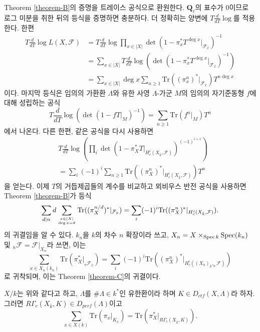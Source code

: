 \noindent
Theorem \ref{theorem-B}의 증명을 트레이스 공식으로 환원한다.
$\mathbf{Q}_\ell$의 표수가 0이므로 로그 미분을 취한 뒤의 등식을
증명하면 충분하다. 더 정확히는 양변에
$T\frac{d}{dT} \log$를 적용한다. 한편
\begin{align*}
T \frac{d}{dT} \log L(X, \mathcal{F})
& =
T\frac{d}{dT} \log
\prod_{x \in |X|} \det(1 - \pi_x^* T^{\deg x} |_{\mathcal{F}_{\bar x}})^{-1} \\
& =
\sum_{x \in |X|} T \frac{d}{dT} \log
( \det(1 - \pi_x^* T^{\deg x} |_{\mathcal{F}_{\bar x}})^{-1}) \\
& =
\sum_{x \in |X|} \deg x
\sum_{n \geq 1} \text{Tr}((\pi_x^n)^* |_{\mathcal{F}_{\bar x}}) T^{n\deg x}
\end{align*}
이다. 마지막 등식은 임의의 가환환 $\Lambda$와 유한 사영
$\Lambda$-가군 $M$의 임의의 자기준동형 $f$에 대해 성립하는 공식
$$
T\frac{d}{dT}\log\left(\det\left(1-fT|_M\right)^{-1}\right) = \sum_{n\geq 1}
\text{Tr}(f^n|_M)T^n
$$
에서 나온다. 다른 한편, 같은 공식을 다시 사용하면
\begin{align*}
& T\frac{d}{dT} \log\left(
\prod\nolimits_i
\det(1-\pi_X^*T |_{H_c^i\left(X_{\bar k} , \mathcal{F}\right)})^{(-1)^{i+1}}
\right) \\
& =
\sum\nolimits_i (-1)^i \sum\nolimits_{n \geq 1}
\text{Tr}\left((\pi_X^n)^* |_{H_c^i(X_{\bar k},\mathcal{F})}\right) T^n
\end{align*}
을 얻는다. 이제 $T$의 거듭제곱들의 계수를 비교하고 뫼비우스
반전 공식을 사용하면 Theorem \ref{theorem-B}가 등식
$$
\sum_{d | n} d \sum_{x \in |X| \atop \deg x = d}
\text{Tr}((\pi_X^{n/d})^* |_{\mathcal{F}_{\bar x}}) =
\sum_i (-1)^i \text{Tr}((\pi^n_X)^* |_{H^i_c(X_{\bar k}, \mathcal{F})}).
$$
의 귀결임을 알 수 있다. $k_n$을 $k$의 차수 $n$ 확장이라 쓰고,
$X_n = X \times_{\mathop{\mathrm{Spec}} k} \mathop{\mathrm{Spec}}(k_n)$ 및
$_n\mathcal{F} = \mathcal{F}|_{X_n}$라 쓰면, 이는
$$
\sum_{x \in X_n(k_n)} \text{Tr}(\pi_X^* |_{_n\mathcal{F}_{\bar x}})
=
\sum_i (-1)^i \text{Tr}((\pi^n_X)^* |_{H^i_c({(X_n)}_{\bar k}, _n\mathcal{F})})
$$
로 귀착되며, 이는 Theorem \ref{theorem-C}의 귀결이다.



\begin{theorem}
\label{theorem-D}
$X/k$는 위와 같다고 하고, $\Lambda$를
$\#\Lambda \in k^*$인 유한환이라 하며
$K\in D_{ctf}(X, \Lambda)$라 하자. 그러면
$R\Gamma_c(X_{\bar k}, K)\in D_{perf}(\Lambda)$이고
$$
\sum_{x\in X(k)}\text{Tr}\left(\pi_x |_{K_{\bar x}}\right) =
\text{Tr}\left(\pi_X^* |_{R\Gamma_c(X_{\bar k}, K )}\right).
$$
\end{theorem}

